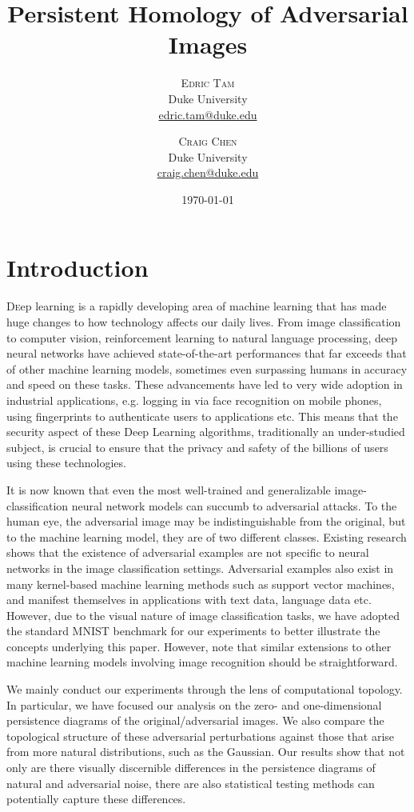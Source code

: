 \documentclass[twoside,twocolumn]{article}
\title{\LARGE Persistent Homology of Adversarial Images} %
\author{%
\textsc{Edric Tam}\\[1ex] %
\normalsize Duke University \\ %
\normalsize \href{mailto:edric.tam@duke.edu}{edric.tam@duke.edu} %
\and %
\textsc{Craig Chen}\\[1ex] %
\normalsize Duke University \\ %
\normalsize \href{mailto:craig.chen@duke.edu}{craig.chen@duke.edu} %
}
\date{\today} %
\begin{document}
\maketitle


\section{Introduction}

\lettrine[nindent=0em,lines=3]{D} eep learning is a rapidly developing area of machine learning that has made huge changes to how technology affects our daily lives. From image classification to computer vision, reinforcement learning to natural language processing, deep neural networks have achieved state-of-the-art performances that far exceeds that of other machine learning models, sometimes even surpassing humans in accuracy and speed on these tasks. These advancements have led to very wide adoption in industrial applications, e.g. logging in via face recognition on mobile phones, using fingerprints to authenticate users to applications etc. This means that the security aspect of these Deep Learning algorithms, traditionally an under-studied subject, is crucial to ensure that the privacy and safety of the billions of users using these technologies. 

It is now known that even the most well-trained and generalizable image-classification neural network models can succumb to adversarial attacks. To the human eye, the adversarial image may be indistinguishable from the original, but to the machine learning model, they are of two different classes. Existing research shows that the existence of adversarial examples are not specific to neural networks in the image classification settings. Adversarial examples also exist in many kernel-based machine learning methods such as support vector machines, and manifest themselves in applications with text data, language data etc. However, due to the visual nature of image classification tasks, we have adopted the standard MNIST benchmark for our experiments to better illustrate the concepts underlying this paper. However, note that similar extensions to other machine learning models involving image recognition should be straightforward. 

We mainly conduct our experiments through the lens of computational topology. In particular, we have focused our analysis on the zero- and one-dimensional persistence diagrams of the original/adversarial images. We also compare the topological structure of these adversarial perturbations against those that arise from more natural distributions, such as the Gaussian. Our results show that not only are there visually discernible differences in the persistence diagrams of natural and adversarial noise, there are also statistical testing methods can potentially capture these differences.
\end{document}
